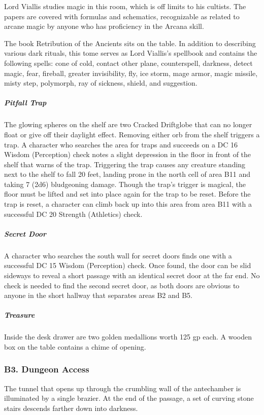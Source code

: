 \documentclass[10pt,a4paper,twoside,bg=print,twocolumn,openany,nodeprecatedcode]{dndbook}
\begin{document}
Lord Viallis studies magic in this room, which is off limits to his cultists. The papers are covered with formulas and schematics, recognizable as related to arcane magic by anyone who has proficiency in the Arcana skill.

The book Retribution of the Ancients sits on the table. In addition to describing various dark rituals, this tome serves as Lord Viallis's spellbook and contains the following spells: cone of cold, contact other plane, counterspell, darkness, detect magic, fear, fireball, greater invisibility, fly, ice storm, mage armor, magic missile, misty step, polymorph, ray of sickness, shield, and suggestion.

\subparagraph{Pitfall Trap}
The glowing spheres on the shelf are two Cracked Driftglobe that can no longer float or give off their daylight effect. Removing either orb from the shelf triggers a trap. A character who searches the area for traps and succeeds on a DC 16 Wisdom (Perception) check notes a slight depression in the floor in front of the shelf that warns of the trap. Triggering the trap causes any creature standing next to the shelf to fall 20 feet, landing prone in the north cell of area B11 and taking 7 (2d6) bludgeoning damage. Though the trap's trigger is magical, the floor must be lifted and set into place again for the trap to be reset. Before the trap is reset, a character can climb back up into this area from area B11 with a successful DC 20 Strength (Athletics) check.

\subparagraph{Secret Door}
A character who searches the south wall for secret doors finds one with a successful DC 15 Wisdom (Perception) check. Once found, the door can be slid sideways to reveal a short passage with an identical secret door at the far end. No check is needed to find the second secret door, as both doors are obvious to anyone in the short hallway that separates areas B2 and B5.

\subparagraph{Treasure}
Inside the desk drawer are two golden medallions worth 125 gp each. A wooden box on the table contains a chime of opening.

\subsubsection{B3. Dungeon Access}
\begin{DndReadAloud}{}
The tunnel that opens up through the crumbling wall of the antechamber is illuminated by a single brazier. At the end of the passage, a set of curving stone stairs descends farther down into darkness.

\end{DndReadAloud}
\end{document}
